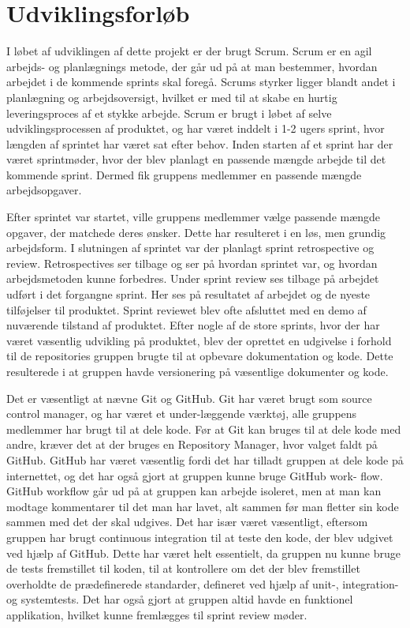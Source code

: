 \section{Udviklingsforløb}

I løbet af udviklingen af dette projekt er der brugt Scrum. Scrum er en agil arbejds- og planlægnings metode, der går ud på at man bestemmer, hvordan arbejdet i de kommende sprints skal foregå. Scrums styrker ligger blandt andet i planlægning og arbejdsoversigt, hvilket er med til at skabe en hurtig leveringsproces af et stykke arbejde. Scrum er brugt i løbet af selve udviklingsprocessen af produktet, og har været inddelt i 1-2 ugers sprint, hvor længden af sprintet har været sat efter behov. Inden starten af et sprint har der været sprintmøder, hvor der blev planlagt en passende mængde arbejde til det kommende sprint. Dermed fik gruppens medlemmer en passende mængde arbejdsopgaver.

Efter sprintet var startet, ville gruppens medlemmer vælge passende mængde opgaver, der matchede deres ønsker. Dette har resulteret i en løs, men grundig arbejdsform. I slutningen af sprintet var der planlagt sprint retrospective og review. Retrospectives ser tilbage og ser på hvordan sprintet var, og hvordan arbejdsmetoden kunne forbedres. Under sprint review ses tilbage på arbejdet udført i det forgangne sprint. Her ses på resultatet af arbejdet og de nyeste tilføjelser til produktet. Sprint reviewet blev ofte afsluttet med en demo af nuværende tilstand af produktet. Efter nogle af de store sprints, hvor der har været væsentlig udvikling på produktet, blev der oprettet en udgivelse i forhold til de repositories gruppen brugte til at opbevare dokumentation og kode. Dette resulterede i at gruppen havde versionering på væsentlige dokumenter og kode.

Det er væsentligt at nævne Git og GitHub. Git har været brugt som source control manager, og har været et under-læggende værktøj, alle gruppens medlemmer har brugt til at dele kode. Før at Git kan bruges til at dele kode med andre, kræver det at der bruges en Repository Manager, hvor valget faldt på GitHub. GitHub har været væsentlig fordi det har tilladt gruppen at dele kode på internettet, og det har også gjort at gruppen kunne bruge GitHub work- flow. GitHub workflow går ud på at gruppen kan arbejde isoleret, men at man kan modtage kommentarer til det man har lavet, alt sammen før man fletter sin kode sammen med det der skal udgives. Det har især været væsentligt, eftersom gruppen har brugt continuous integration til at teste den kode, der blev udgivet ved hjælp af GitHub. Dette har været helt essentielt, da gruppen nu kunne bruge de tests fremstillet til koden, til at kontrollere om det der blev fremstillet overholdte de prædefinerede standarder, defineret ved hjælp af unit-, integration- og systemtests. Det har også gjort at gruppen altid havde en funktionel applikation, hvilket kunne fremlægges til sprint review møder.


